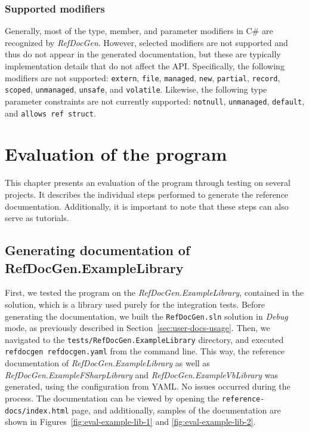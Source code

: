 \subsection*{Supported modifiers}

Generally, most of the type, member, and parameter modifiers in C\# are recognized by \textit{RefDocGen}.
However, selected modifiers are not supported and thus do not appear in the generated documentation, but these are typically implementation details that do not affect the API.
Specifically, the following modifiers are not supported:
\texttt{extern}, \texttt{file}, \texttt{managed}, \texttt{new}, \texttt{partial}, \texttt{record}, \texttt{scoped}, \texttt{unmanaged}, \texttt{unsafe}, and \texttt{volatile}.
Likewise, the following type parameter constraints are not currently supported:
\texttt{notnull}, \texttt{unmanaged}, \texttt{default}, and \texttt{allows ref struct}.

\chapter{Evaluation of the program}
\label{ch:six}

This chapter presents an evaluation of the program through testing on several projects. 
It describes the individual steps performed to generate the reference documentation. 
Additionally, it is important to note that these steps can also serve as tutorials.

\section{Generating documentation of RefDocGen.ExampleLibrary}
\label{sec:evaluation-example-library}

First, we tested the program on the \textit{RefDocGen.ExampleLibrary}, contained in the solution, which is a library used purely for the integration tests.
Before generating the documentation, we built the \texttt{RefDocGen.sln} solution in \textit{Debug} mode, as previously described in Section~\ref{sec:user-docs-usage}. 
Then, we navigated to the \texttt{tests/RefDocGen.ExampleLibrary} directory, and executed \texttt{refdocgen refdoc\-gen.yaml} from the command line.
This way, the reference documentation of \textit{RefDocGen.ExampleLibrary} as well as \textit{RefDocGen.ExampleFSharpLibrary} and \textit{RefDocGen.ExampleVbLibrary} was generated, using the configuration from YAML.
No issues occurred during the process.
The documentation can be viewed by opening the \texttt{reference-docs/index.html} page, and additionally, samples of the documentation are shown in Figures~\ref{fig:eval-example-lib-1} and \ref{fig:eval-example-lib-2}.

